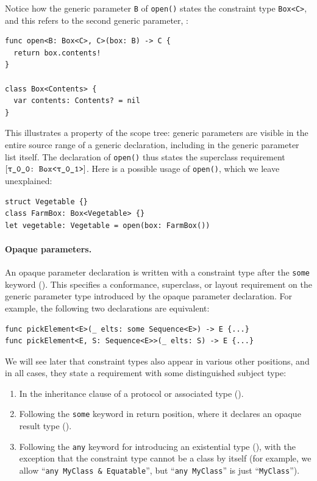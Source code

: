 \documentclass[../generics]{subfiles}
\begin{document}
\begin{example}
Notice how the generic parameter \texttt{B} of \texttt{open()} states the constraint type \texttt{Box<C>}, and this refers to the second generic parameter, \tC:
\begin{Verbatim}
func open<B: Box<C>, C>(box: B) -> C {
  return box.contents!
}

class Box<Contents> {
  var contents: Contents? = nil
}
\end{Verbatim}
This illustrates a property of the scope tree: generic parameters are visible in the entire source range of a generic declaration, including in the generic parameter list itself.
The declaration of \texttt{open()} thus states the superclass requirement $\ConfReq{\rT}{Box<\rU>}$. Here is a possible usage of \texttt{open()}, which we leave unexplained:
\begin{Verbatim}
struct Vegetable {}
class FarmBox: Box<Vegetable> {}
let vegetable: Vegetable = open(box: FarmBox())
\end{Verbatim}
\end{example}

\paragraph{Opaque parameters.}
An opaque parameter declaration is written with a constraint type after the \texttt{some} keyword (). This specifies a conformance, superclass, or layout requirement on the generic parameter type introduced by the opaque parameter declaration. For example, the following two declarations are equivalent:
\begin{Verbatim}
func pickElement<E>(_ elts: some Sequence<E>) -> E {...}
func pickElement<E, S: Sequence<E>>(_ elts: S) -> E {...}
\end{Verbatim}

We will see later that constraint types also appear in various other positions, and in all cases, they state a requirement with some distinguished subject type:
\begin{enumerate}
\item In the inheritance clause of a protocol or associated type ().
\item Following the \texttt{some} keyword in return position, where it declares an opaque result type ().
\item Following the \texttt{any} keyword for introducing an existential type (), with the exception that the constraint type cannot be a class by itself (for example, we allow ``\verb|any MyClass & Equatable|'', but ``\verb|any MyClass|'' is just ``\texttt{MyClass}'').
\end{enumerate}
\end{document}

